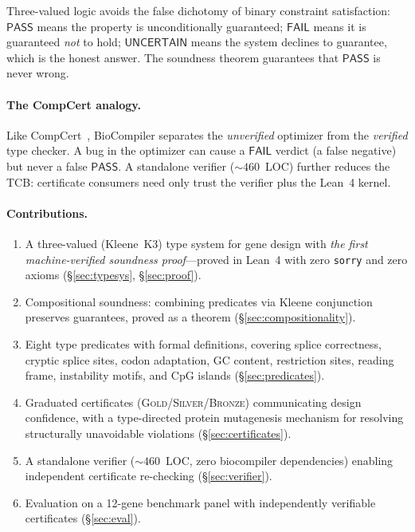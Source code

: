 \documentclass[runningheads]{llncs}
\newcommand{\PASS}{\ensuremath{\mathsf{PASS}}\xspace}
\newcommand{\FAIL}{\ensuremath{\mathsf{FAIL}}\xspace}
\newcommand{\UNCERTAIN}{\ensuremath{\mathsf{UNCERTAIN}}\xspace}
\newcommand{\GOLD}{\textsc{Gold}\xspace}
\newcommand{\SILVER}{\textsc{Silver}\xspace}
\newcommand{\BRONZE}{\textsc{Bronze}\xspace}
\begin{document}
Three-valued logic avoids the false dichotomy of binary constraint
satisfaction: \PASS{} means the property is unconditionally guaranteed;
\FAIL{} means it is guaranteed \emph{not} to hold; \UNCERTAIN{} means
the system declines to guarantee, which is the honest answer.
The soundness theorem guarantees that \PASS{} is never wrong.

\paragraph{The CompCert analogy.}
Like CompCert~\cite{leroy2009compcert}, BioCompiler separates the
\emph{unverified} optimizer from the \emph{verified} type checker.
A bug in the optimizer can cause a \FAIL{} verdict (a false negative)
but never a false \PASS.
A standalone verifier (${\sim}460$~LOC) further reduces the TCB:
certificate consumers need only trust the verifier plus the Lean~4
kernel.

\paragraph{Contributions.}
\begin{enumerate}[leftmargin=*,itemsep=1pt,topsep=2pt]
\item A three-valued (Kleene~K3) type system for gene design with
      \emph{the first machine-verified soundness proof}---proved in
      Lean~4 with zero \texttt{sorry} and zero axioms
      (\S\ref{sec:typesys}, \S\ref{sec:proof}).

\item Compositional soundness: combining predicates via Kleene
      conjunction preserves guarantees, proved as a theorem
      (\S\ref{sec:compositionality}).

\item Eight type predicates with formal definitions, covering splice
      correctness, cryptic splice sites, codon adaptation, GC content,
      restriction sites, reading frame, instability motifs, and CpG
      islands (\S\ref{sec:predicates}).

\item Graduated certificates (\GOLD/\SILVER/\BRONZE) communicating
      design confidence, with a type-directed protein mutagenesis
      mechanism for resolving structurally unavoidable violations
      (\S\ref{sec:certificates}).

\item A standalone verifier (${\sim}460$~LOC, zero biocompiler
      dependencies) enabling independent certificate re-checking
      (\S\ref{sec:verifier}).

\item Evaluation on a 12-gene benchmark panel with independently
      verifiable certificates (\S\ref{sec:eval}).
\end{enumerate}
\end{document}
